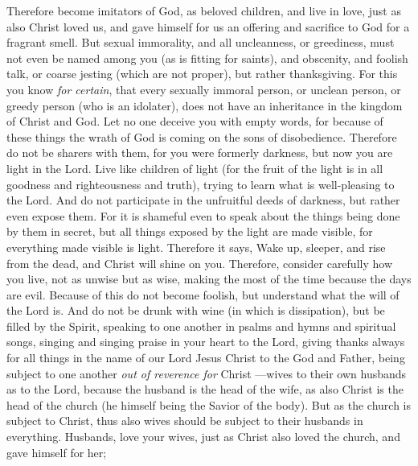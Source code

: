 \begin{biblechapter} %
 Therefore become imitators of God, as beloved children,
\verse and live in love, just as also Christ loved us, and gave himself for us an offering and sacrifice to God for a fragrant smell.
\verse But sexual immorality, and all uncleanness, or greediness, must not even be named among you (as is fitting for saints),
\verse and obscenity, and foolish talk, or coarse jesting (which are not proper), but rather thanksgiving.
\verse For this you know \textit{for certain}, that every sexually immoral person, or unclean person, or greedy person (who is an idolater), does not have an inheritance in the kingdom of Christ and God.
\verse Let no one deceive you with empty words, for because of these things the wrath of God is coming on the sons of disobedience.
 Therefore do not be sharers with them,
\verse for you were formerly darkness, but now you are light in the Lord. Live like children of light
\verse (for the fruit of the light is in all goodness and righteousness and truth),
\verse trying to learn what is well-pleasing to the Lord.
\verse And do not participate in the unfruitful deeds of darkness, but rather even expose them.
\verse For it is shameful even to speak about the things being done by them in secret,
\verse but all things exposed by the light are made visible,
\verse for everything made visible is light. Therefore it says, Wake up, sleeper, 
and rise from the dead, 
and Christ will shine on you.
\verse Therefore, consider carefully how you live, not as unwise but as wise,
\verse making the most of the time because the days are evil.
 Because of this do not become foolish, but understand what the will of the Lord is.
\verse And do not be drunk with wine (in which is dissipation), but be filled by the Spirit,
\verse speaking to one another in psalms and hymns and spiritual songs, singing and singing praise in your heart to the Lord,
\verse giving thanks always for all things in the name of our Lord Jesus Christ to the God and Father,
\verse being subject to one another \textit{out of reverence for} Christ
\verse —wives to their own husbands as to the Lord,
\verse because the husband is the head of the wife, as also Christ is the head of the church (he himself being the Savior of the body).
\verse But as the church is subject to Christ, thus also wives should be subject to their husbands in everything.
 Husbands, love your wives, just as Christ also loved the church, and gave himself for her;

\end{biblechapter}
